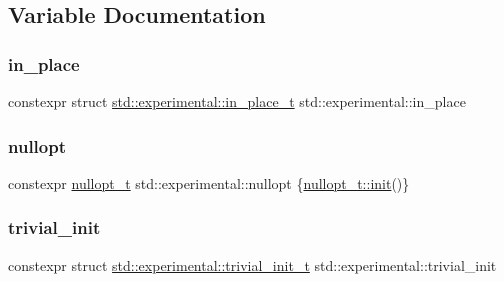 \subsection{Variable Documentation}
\mbox{\label{namespacestd_1_1experimental_a93be82cb49ba2dc64a23c881ad152fd6}} 
\subsubsection{\texorpdfstring{in\+\_\+place}{in\_place}}
{\footnotesize\ttfamily constexpr struct \mbox{\hyperlink{structstd_1_1experimental_1_1in__place__t}{std\+::experimental\+::in\+\_\+place\+\_\+t}}  std\+::experimental\+::in\+\_\+place}

\mbox{\label{namespacestd_1_1experimental_af16e944368340cafdc29647c42a1f542}} 
\subsubsection{\texorpdfstring{nullopt}{nullopt}}
{\footnotesize\ttfamily constexpr \mbox{\hyperlink{structstd_1_1experimental_1_1nullopt__t}{nullopt\+\_\+t}} std\+::experimental\+::nullopt \{\mbox{\hyperlink{structstd_1_1experimental_1_1nullopt__t_1_1init}{nullopt\+\_\+t\+::init}}()\}}

\mbox{\label{namespacestd_1_1experimental_a453a56e465f134032297679f0511f02b}} 
\subsubsection{\texorpdfstring{trivial\+\_\+init}{trivial\_init}}
{\footnotesize\ttfamily constexpr struct \mbox{\hyperlink{structstd_1_1experimental_1_1trivial__init__t}{std\+::experimental\+::trivial\+\_\+init\+\_\+t}}  std\+::experimental\+::trivial\+\_\+init}

